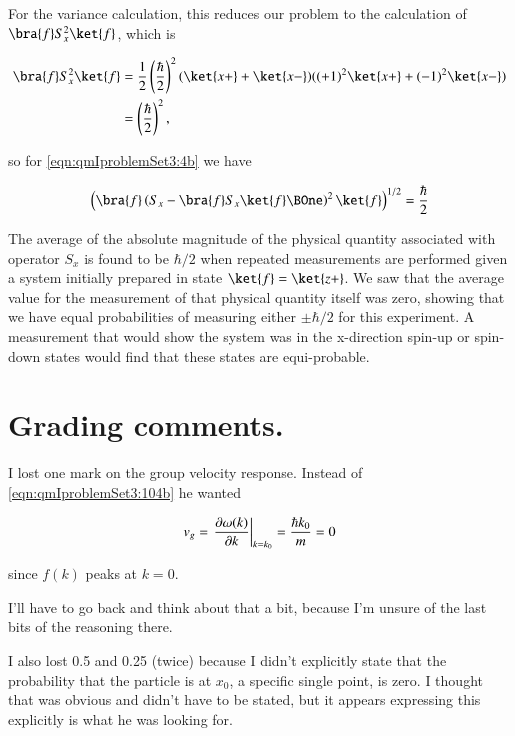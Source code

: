 For the variance calculation, this reduces our problem to the calculation of $\bra{f} S_x^2 \ket{f}$, which is

\begin{align*}
\bra{f} S_x^2 \ket{f} 
&=
\inv{2} \left( \frac{\hbar}{2} \right)^2 
( \ket{x+} + \ket{x-} ) ( (+1)^2 \ket{x+} + (-1)^2 \ket{x-} ) \\
&=
\left( \frac{\hbar}{2} \right)^2,
\end{align*}

so for \ref{eqn:qmIproblemSet3:4b} we have

\begin{align}\label{eqn:qmIproblemSet3:4b}
\left(\bra{f} \left( S_x - \bra{f} S_x \ket{f} \BOne \right)^2 \ket{f} \right)^{1/2} = \frac{\hbar}{2}
\end{align}

The average of the absolute magnitude of the physical quantity associated with operator $S_x$ is found to be $\hbar/2$ when repeated measurements are performed given a system initially prepared in state $\ket{f} = \ket{z+}$.  We saw that the average value for the measurement of that physical quantity itself was zero, showing that we have equal probabilities of measuring either $\pm \hbar/2$ for this experiment.  A measurement that would show the system was in the x-direction spin-up or spin-down states would find that these states are equi-probable.

\section{Grading comments.}

I lost one mark on the group velocity response.  Instead of \ref{eqn:qmIproblemSet3:104b} he wanted

\begin{align}\label{eqn:qmIproblemSet3:104b}
v_g = {\left. \PD{k}{\omega(k)} \right\vert}_{k = k_0}= \frac{\hbar k_0}{m} = 0
\end{align}

since $f(k)$ peaks at $k=0$.

I'll have to go back and think about that a bit, because I'm unsure of the last bits of the reasoning there.

I also lost 0.5 and 0.25 (twice) because I didn't explicitly state that the probability that the particle is at $x_0$, a specific single point, is zero.  I thought that was obvious and didn't have to be stated, but it appears expressing this explicitly is what he was looking for.

